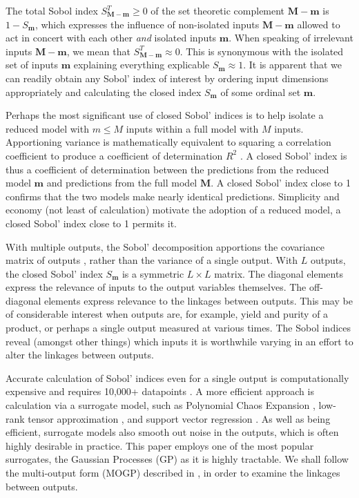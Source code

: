 \documentclass[preprint,12pt]{elsarticle}
\newcommand*{\x}{\times}
\newcommand*{\mi}[1]{\mathbf{#1}}
\begin{document}
    The total Sobol index $S^{T}_{\mi{M-m}} \geq 0$ of the set theoretic complement $\mi{M-m}$ is $1-S_{\mi{m}}$, which expresses the influence of non-isolated inputs $\mi{M-m}$ allowed to act in concert with each other \emph{and} isolated inputs $\mi{m}$. When speaking of irrelevant inputs $\mi{M-m}$, we mean that $S^{T}_{\mi{M-m}} \approx 0$. This is synonymous with the isolated set of inputs $\mi{m}$ explaining everything explicable $S_{\mi{m}}\approx 1$.
    It is apparent that we can readily obtain any Sobol' index of interest by ordering input dimensions appropriately and calculating the closed index $S_{\mi{m}}$ of some ordinal set $\mi{m}$.

    Perhaps the most significant use of closed Sobol' indices is to help isolate a reduced model with $m\leq M$ inputs within a full model with $M$ inputs.
    Apportioning variance is mathematically equivalent to squaring a correlation coefficient to produce a coefficient of determination $R^{2}$ \cite{Chicco2021}. A closed Sobol' index is thus a coefficient of determination between the predictions from the reduced model $\mi{m}$ and predictions from the full model $\mi{M}$. A closed Sobol' index close to 1 confirms that the two models make nearly identical predictions. Simplicity and economy (not least of calculation) motivate the adoption of a reduced model, a closed Sobol' index close to 1 permits it.

    With multiple outputs, the Sobol' decomposition apportions the covariance matrix of outputs \cite{Gamboa.etal2013}, rather than the variance of a single output. With $L$ outputs, the closed Sobol' index $S_{\mi{m}}$ is a symmetric $L\x L$ matrix. The diagonal elements express the relevance of inputs to the output variables themselves. The off-diagonal elements express relevance to the linkages between outputs. This may be of considerable interest when outputs are, for example, yield and purity of a product, or perhaps a single output measured at various times. The Sobol indices reveal (amongst other things) which inputs it is worthwhile varying in an effort to alter the linkages between outputs.

    Accurate calculation of Sobol' indices even for a single output is computationally expensive and requires 10,000+ datapoints \cite{Lamoureux.etal2014}. A more efficient approach is calculation via a surrogate model, such as Polynomial Chaos Expansion \cite{Ghanem.Spanos1997,Xiu.Karniadakis2002,Xiu2010}, low-rank tensor approximation \cite{Chevreuil.etal2015,Konakli.Sudret2016}, and support vector regression \cite{Cortes.Vapnik1995}. As well as being efficient, surrogate models also smooth out noise in the outputs, which is often highly desirable in practice. This paper employs one of the most popular surrogates, the Gaussian Processes (GP) \cite{Sacks.etal1989, Rasmussen.Williams2005} as it is highly tractable. We shall follow the multi-output form (MOGP) described in \cite{Alvarez.etal2011}, in order to examine the linkages between outputs. 
\end{document}
